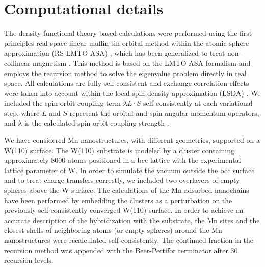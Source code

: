 \documentclass[prl,final,twocolumn]{revtex4-1}
\begin{document}
\section{Computational details}
The density functional theory based calculations 
were performed using the first principles real-space linear muffin-tin orbital method within the atomic sphere approximation (RS-LMTO-ASA)  \cite{frota-pessoaFirstprinciplesRealspaceLinearmuffintinorbital1992,klautauOrbitalMoments3d2005,bergmanMagneticInteractionsMn2006,bergmanMagneticStructuresSmall2007,bezerra-netoComplexMagneticStructure2013,klautauMagneticPropertiesCo2004,frota-pessoaInfluenceInterfaceMixing2002,bergmanNoncollinearMagnetisationClusters2006,PhysRevB.85.014436,PhysRevB.93.014438},  which has been generalized to treat non-collinear magnetism  \cite{bergmanNoncollinearMagnetisationClusters2006,cardias2020first,cardiasDzyaloshinskiiMoriyaInteractionAbsence2020}. 
This method is based on the LMTO-ASA formalism  \cite{andersenLinearMethodsBand1975} and employs the recursion method \cite{haydockRecursiveSolutionSchrodinger1980} to solve the eigenvalue problem directly in real space.   
All calculations are fully self-consistent and exchange-correlation effects were taken into account within 
the local spin density approximation (LSDA)  \cite{barthLocalExchangecorrelationPotential1972}.
We included the spin-orbit coupling term $\lambda L\cdot S$  self-consistently at each variational step, where $L$ and $S$ represent the orbital and spin angular momentum operators, and $\lambda$ is the calculated spin-orbit coupling strength \cite{PhysRevB.42.2707,PhysRevB.69.104401}.  
%
 
We have considered Mn nanostructures, with different geometries, supported on a W(110) surface. 
The W(110) substrate is modeled by a cluster containing approximately 8000 atoms positioned in a bcc lattice with the experimental lattice parameter of W. In order to simulate the vacuum outside the bcc surface and to treat charge transfers correctly, we included two overlayers of empty spheres above the W surface. 
The calculations of the Mn adsorbed nanochains have been performed by embedding the clusters as a perturbation on the previously self-consistently converged W(110) surface.
In order to achieve an accurate description of the hybridization with the substrate, the Mn sites and the closest shells of neighboring atoms (or empty spheres) around the Mn nanostructures were recalculated self-consistently. 
The continued fraction in the recursion method was appended with the Beer-Pettifor terminator \cite{beerRecursionMethodEstimation1984} after 30 recursion levels. 
 
\end{document}
